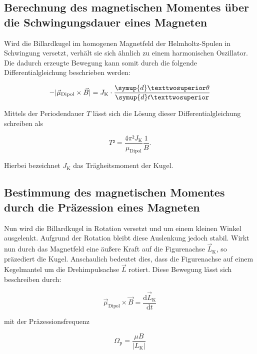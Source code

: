 \subsection{Berechnung des magnetischen Momentes über die Schwingungsdauer eines Magneten}

\noindent Wird die Billardkugel im homogenen Magnetfeld der Helmholtz-Spulen in Schwingung versetzt, verhält sie sich 
ähnlich zu einem harmonischen Oszillator. Die dadurch erzeugte Bewegung kann somit durch die folgende Differentialgleichung
beschrieben werden:

\begin{equation*}
    - | \vec{\mu}_\text{Dipol} \times \vec{B} | = J_\text{K} \cdot \frac{\symup{d}²\theta}{\symup{d}t²}
\end{equation*}

\noindent Mittels der Periodendauer $T$ lässt sich die Lösung dieser Differentialgleichung schreiben als 

\begin{equation}
\label{eqn:Schwingungeqn}
    T² = \frac{4\pi²J_\text{K}}{\mu_\text{Dipol}}\frac{1}{B}.
\end{equation}

\noindent Hierbei bezeichnet $J_\text{K}$ das Trägheitsmoment der Kugel.

\subsection{Bestimmung des magnetischen Momentes durch die Präzession eines Magneten}

\noindent Nun wird die Billardkugel in Rotation versetzt und um einem kleinen Winkel ausgelenkt. Aufgrund 
der Rotation bleibt diese Auslenkung jedoch stabil. Wirkt nun durch das Magnetfeld eine äußere Kraft auf die 
Figurenachse $\vec{L}_\text{K}$, so präzediert die Kugel. Anschaulich bedeutet dies, dass die Figurenachse auf einem Kegelmantel 
um die Drehimpulsachse $\vec{L}$ rotiert. Diese Bewegung lässt sich beschreiben durch:

\begin{equation}
    \vec{\mu}_\text{Dipol} \times \vec{B} = \frac{\text{d}\vec{L}_\text{K}}{\text{d}t}
    \label{eqn:Schwingung}
\end{equation}

\noindent mit der Präzessionsfrequenz 

\begin{equation*}
    \Omega_\text{p} = \frac{\mu B}{| L_\text{K} |}
\end{equation*}

